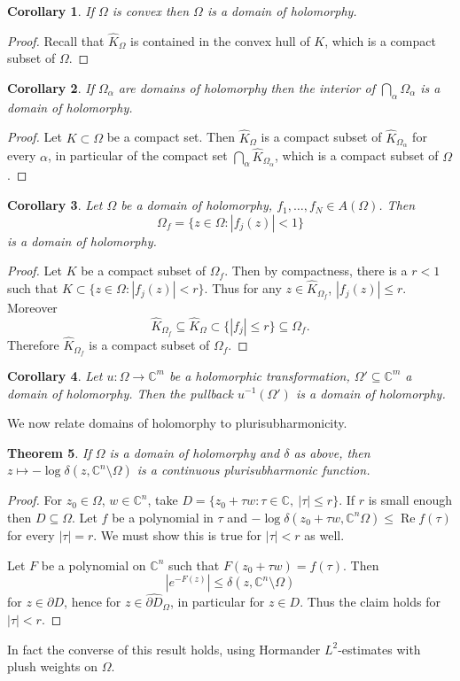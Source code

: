 \documentclass[12pt]{report}
\newcommand{\CC}{\mathbb{C}}
\renewcommand{\Re}{\operatorname{Re}}
\newtheorem{theorem}{Theorem}[chapter]
\newtheorem{corollary}[theorem]{Corollary}
\theoremstyle{definition}
\begin{document}
\begin{corollary}
    If $\Omega$ is convex then $\Omega$ is a domain of holomorphy.
\end{corollary}
\begin{proof}
    Recall that $\hat K_\Omega$ is contained in the convex hull of $K$, which is a compact subset of $\Omega$.
\end{proof}
\begin{corollary}
    If $\Omega_\alpha$ are domains of holomorphy then the interior of $\bigcap_\alpha \Omega_\alpha$ is a domain of holomorphy.
\end{corollary}
\begin{proof}
    Let $K \subset \Omega$ be a compact set. Then $\hat K_\Omega$ is a compact subset of $\hat K_{\Omega_\alpha}$ for every $\alpha$, in particular of the compact set $\bigcap_\alpha \hat K_{\Omega_\alpha}$, which is a compact subset of $\Omega$.
\end{proof}
\begin{corollary}
    Let $\Omega$ be a domain of holomorphy, $f_1, \dots, f_N \in A(\Omega)$. Then
    $$\Omega_f = \{z \in \Omega: |f_j(z)| < 1\}$$
    is a domain of holomorphy.
\end{corollary}
\begin{proof}
    Let $K$ be a compact subset of $\Omega_f$. Then by compactness, there is a $r < 1$ such that $K \subset \{z \in \Omega: |f_j(z)| < r\}$. Thus for any $z \in \hat K_{\Omega_f}$, $|f_j(z)| \leq r$. Moreover
    $$\hat K_{\Omega_f} \subseteq \hat K_\Omega \subset \{|f_j| \leq r\} \subseteq \Omega_f.$$
    Therefore $\hat K_{\Omega_f}$ is a compact subset of $\Omega_f$. 
\end{proof}
\begin{corollary}
    Let $u: \Omega \to \CC^m$ be a holomorphic transformation, $\Omega' \subseteq \CC^m$ a domain of holomorphy. Then the pullback $u^{-1}(\Omega')$ is a domain of holomorphy.
\end{corollary}

We now relate domains of holomorphy to plurisubharmonicity.
\begin{theorem}
    If $\Omega$ is a domain of holomorphy and $\delta$ as above, then $z \mapsto -\log \delta(z, \CC^n \setminus \Omega)$ is a continuous plurisubharmonic function.
\end{theorem}
\begin{proof}
    For $z_0 \in \Omega$, $w \in \CC^n$, take $D = \{z_0 + \tau w: \tau \in \CC, ~|\tau|\leq r\}$. If $r$ is small enough then $D \subseteq \Omega$. Let $f$ be a polynomial in $\tau$ and $-\log \delta(z_0 + \tau w, \CC^n \Omega) \leq \Re f(\tau)$ for every $|\tau| = r$. We must show this is true for $|\tau| < r$ as well.

    Let $F$ be a polynomial on $\CC^n$ such that $F(z_0 + \tau w) = f(\tau)$. Then
    $$|e^{-F(z)}| \leq \delta(z, \CC^n \setminus \Omega)$$
    for $z \in \partial D$, hence for $z \in \widehat{\partial D}_\Omega$, in particular for $z\in D$. Thus the claim holds for $|\tau| < r$. 
\end{proof}
    In fact the converse of this result holds, using Hormander $L^2$-estimates with plush weights on $\Omega$.
\end{document}
